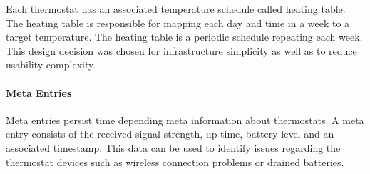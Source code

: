 Each thermostat has an associated temperature schedule called heating table.
The heating table is responsible for mapping each day and time in a week to a target temperature. The heating table is a periodic schedule repeating each week.
This design decision was chosen for infrastructure simplicity as well as to reduce usability complexity.

\paragraph{Meta Entries}

Meta entries persist time depending meta information about thermostats. A meta entry consists of the received signal strength, up-time, battery level and an associated timestamp. This data can be used to identify issues regarding the thermostat devices such as wireless connection problems or drained batteries.